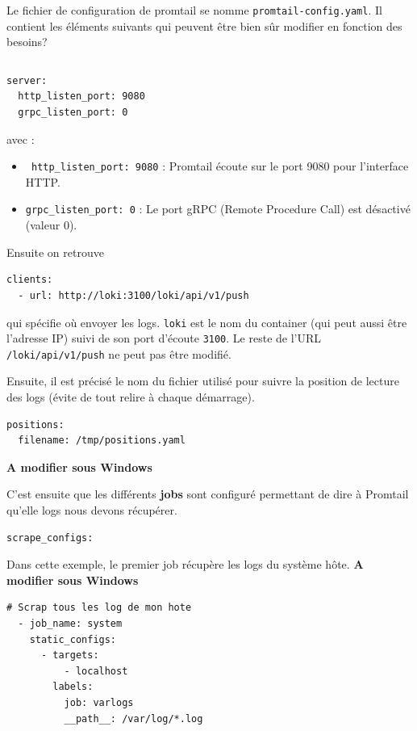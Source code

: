 \documentclass[french, 12pt]{article}%
\newcommand{\itemE}{\item[$\bullet$]}
\begin{document}
Le fichier de configuration de promtail se nomme \verb?promtail-config.yaml?. Il contient les éléments suivants qui peuvent être bien sûr modifier en fonction des besoins?

\begin{lstlisting}[style=commande]

\end{lstlisting}


\begin{lstlisting}[style=commande]
server:
  http_listen_port: 9080
  grpc_listen_port: 0
\end{lstlisting}
avec : 
\begin{itemize}
\itemE  \verb? http_listen_port: 9080? : Promtail écoute sur le port 9080 pour l'interface HTTP.
\itemE  \verb?grpc_listen_port: 0? : Le port gRPC (Remote Procedure Call) est désactivé (valeur 0).
\end{itemize}

Ensuite on retrouve 
\begin{lstlisting}[style=commande]
clients:
  - url: http://loki:3100/loki/api/v1/push
\end{lstlisting}
qui spécifie où envoyer les logs. \verb?loki? est le nom du container (qui peut aussi être l'adresse IP) suivi de son port d'écoute \verb?3100?. Le reste de l'URL \verb?/loki/api/v1/push? ne peut pas être modifié.


Ensuite, il est précisé le nom du fichier utilisé pour suivre la position de lecture des logs (évite de tout relire à chaque démarrage).
\begin{lstlisting}[style=commande]
positions:
  filename: /tmp/positions.yaml
\end{lstlisting}
\textbf{A modifier sous Windows}




C'est ensuite que les différents \textbf{jobs} sont configuré permettant de dire à Promtail qu'elle logs nous devons récupérer. 

\begin{lstlisting}[style=commande]
scrape_configs:
\end{lstlisting}

Dans cette exemple, le premier job récupère les logs du système hôte. \textbf{A modifier sous Windows}
\begin{lstlisting}[style=commande]
  # Scrap tous les log de mon hote
  - job_name: system
    static_configs:
      - targets:
          - localhost
        labels:
          job: varlogs
          __path__: /var/log/*.log
\end{lstlisting}
\end{document}
